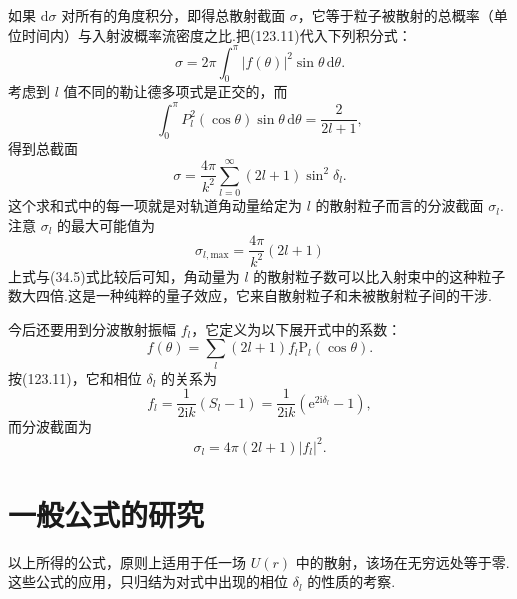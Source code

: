 如果 $\mathrm{d}\sigma$ 对所有的角度积分，即得总散射截面 $\sigma$，它等于粒子被散射的总概率（单位时间内）与入射波概率流密度之比.把(123.11)代入下列积分式：
\begin{equation*}
  \sigma=2\pi\int_0^{\pi}|f(\theta)|^2\sin\theta\,\mathrm{d}\theta.
\end{equation*}
考虑到 $l$ 值不同的勒让德多项式是正交的，而
\begin{equation*}
  \int_0^{\pi}P_l^2(\cos\theta)\sin\theta\,\mathrm{d}\theta
  =\frac{2}{2l+1},
\end{equation*}
得到总截面
\begin{equation}
  \sigma=\frac{4\pi}{k^2}\sum_{l=0}^{\infty}(2l+1)\sin^2\delta_l.
\end{equation}
这个求和式中的每一项就是对轨道角动量给定为 $l$ 的散射粒子而言的分波截面 $\sigma_l$.注意 $\sigma_l$ 的最大可能值为
\begin{equation}
  \sigma_{l,\mathrm{max}}=\frac{4\pi}{k^2}(2l+1)
\end{equation}
上式与(34.5)式比较后可知，角动量为 $l$ 的散射粒子数可以比入射束中的这种粒子数大四倍.这是一种纯粹的量子效应，它来自散射粒子和未被散射粒子间的干涉.

今后还要用到分波散射振幅 $f_l$，它定义为以下展开式中的系数：
\begin{equation}
  f(\theta)=\sum_l(2l+1)f_l\mathrm{P}_l(\cos\theta).
\end{equation}
按(123.11)，它和相位 $\delta_l$ 的关系为
\begin{equation}
  f_l=\frac{1}{2\mathrm{i}k}(S_l-1)
  =\frac{1}{2\mathrm{i}k}\left(\mathrm{e}^{2\mathrm{i}\delta_l}-1\right),
\end{equation}
而分波截面为
\begin{equation}
  \sigma_l=4\pi(2l+1)|f_l|^2.
\end{equation}

\setcounter{equation}{0}%

\section{一般公式的研究}

以上所得的公式，原则上适用于任一场 $U(r)$ 中的散射，该场在无穷远处等于零.这些公式的应用，只归结为对式中出现的相位 $\delta_l$ 的性质的考察.

